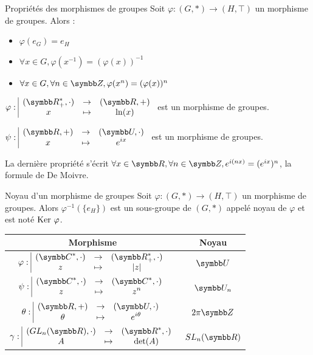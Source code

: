 \begin{proposition}{Propriétés des morphismes de groupes}{}
    Soit $\varphi : (G, \ast) \to (H, \top)$ un morphisme de groupes.
    Alors :
    \begin{itemize}
        \item $\varphi(e_G) = e_H$
        \item $\forall x \in G, \varphi(x^{-1}) = (\varphi(x))^{-1}$
        \item $\forall x \in G, \forall n \in \Z, \varphi(x^n) = (\varphi(x))^n$
    \end{itemize}
\end{proposition}

\begin{exemple}
    $\fonction{\varphi}{(\R_+^*, \cdot)}{(\R, +)}{x}{\ln(x)}$ est un morphisme de groupes.
    
    $\fonction{\psi}{(\R, +)}{(\symbb U, \cdot)}{x}{e^{ix}}$ est un morphisme de groupes.

    La dernière propriété s'écrit $\forall x \in \R, \forall n \in \Z, e^{i(nx)} = (e^{ix})^n$, 
    la formule de De Moivre.
\end{exemple}

\begin{theoreme}{Noyau d'un morphisme de groupes}{}
    Soit $\varphi : (G, \ast) \to (H, \top)$ un morphisme de groupes. 
    Alors $\varphi^{-1}(\{e_H\})$ est un sous-groupe de $(G, \ast)$ appelé noyau de 
    $\varphi$ et est noté $\operatorname{Ker} \, \varphi$.
\end{theoreme}

\begin{exemple}
    \begin{center}
    \begin{tabular}{cc}
        \toprule
        Morphisme & Noyau \\
        \midrule
        $\fonction{\varphi}{(\C^*, \cdot)}{(\R_+^*, \cdot)}{z}{|z|}$ & $\symbb U$ \\
        \addlinespace[2pt]
        $\fonction{\psi}{(\C^*, \cdot)}{(\C^*, \cdot)}{z}{z^n}$ & $\symbb U_n$ \\
        \addlinespace[2pt]
        $\fonction{\theta}{(\R, +)}{(\symbb U, \cdot)}{\theta}{e^{i\theta}}$ & $2\pi \Z$ \\
        \addlinespace[2pt]
        $\fonction{\gamma}{(GL_n(\R), \cdot)}{(\R^*, \cdot)}{A}{\det(A)}$ & $SL_n(\R)$ \\
        \bottomrule        
    \end{tabular}
    \end{center}
\end{exemple}

